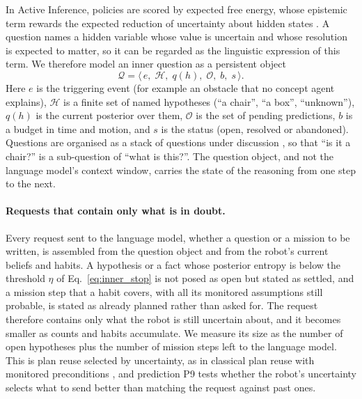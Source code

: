 In Active Inference, policies are scored by expected free energy, whose epistemic term rewards the expected
reduction of uncertainty about hidden states \cite{friston2017process, parr2022active}. A question names a hidden
variable whose value is uncertain and whose resolution is expected to matter, so it can be regarded as the
linguistic expression of this term. We therefore model an inner question as a persistent object
\begin{equation}
    \mathcal{Q} = \big\langle\, e,\; \mathcal{H},\; q(h),\; \mathcal{O},\; b,\; s \,\big\rangle .
    \label{eq:inner_question}
\end{equation}
Here $e$ is the triggering event (for example an obstacle that no concept agent explains), $\mathcal{H}$ is a finite
set of named hypotheses (``a chair'', ``a box'', ``unknown''), $q(h)$ is the current posterior over them,
$\mathcal{O}$ is the set of pending predictions, $b$ is a budget in time and motion, and $s$ is the status (open,
resolved or abandoned). Questions are organised as a stack of questions under discussion
\cite{roberts2012information}, so that ``is it a chair?'' is a sub-question of ``what is this?''. The question
object, and not the language model's context window, carries the state of the reasoning from one step to the next.

\paragraph{Requests that contain only what is in doubt.}
Every request sent to the language model, whether a question or a mission to be written, is assembled from the
question object and from the robot's current beliefs and habits. A hypothesis or a fact whose posterior entropy is
below the threshold $\eta$ of Eq.~\eqref{eq:inner_stop} is not posed as open but stated as settled, and a mission step that a habit covers, with all its
monitored assumptions still probable, is stated as already planned rather than asked for. The request therefore
contains only what the robot is still uncertain about, and it becomes smaller as counts and habits accumulate. We
measure its size as the number of open hypotheses plus the number of mission steps left to the language model. This
is plan reuse selected by uncertainty, as in classical plan reuse with monitored preconditions
\cite{fikes1972learning}, and prediction P9 tests whether the robot's uncertainty selects what to send better than
matching the request against past ones.

